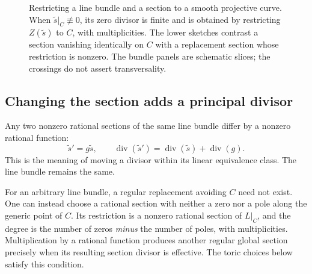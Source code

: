 \documentclass[11pt]{article}
\theoremstyle{definition}
\theoremstyle{remark}
\DeclareMathOperator{\divisor}{div}
\newcommand{\x}{\times}
\begin{document}
\begin{figure}[htbp]
    \caption{Restricting a line bundle and a section to a smooth projective
    curve. When \(\widetilde{s}|_C\not\equiv0\), its zero divisor is finite and is
    obtained by restricting \(Z(\widetilde{s})\) to \(C\), with multiplicities.
    The lower sketches contrast a section vanishing identically on \(C\)
    with a replacement section whose restriction is nonzero.
    The bundle panels are schematic slices; the crossings do not assert transversality.}
    \label{fig:oct19-diagram10}
\end{figure}

\subsection{Changing the section adds a principal divisor}

Any two nonzero rational sections of the same line bundle differ
by a nonzero rational function:
\[
    \widetilde{s}'=g\widetilde{s},\qquad
    \divisor(\widetilde{s}')
       =\divisor(\widetilde{s})+\divisor(g).
\]
This is the meaning of moving a divisor within its linear equivalence
class. The line bundle remains the same.

For an arbitrary line bundle, a regular replacement avoiding \(C\)
need not exist. One can instead choose a rational section with neither
a zero nor a pole along the generic point of \(C\). Its restriction
is a nonzero rational section of \(L|_C\), and the degree is the
number of zeros \emph{minus} the number of poles, with multiplicities.
Multiplication by a rational function produces another regular global
section precisely when its resulting section divisor is effective.
The toric choices below satisfy this condition.
\end{document}
